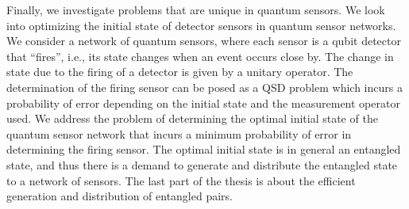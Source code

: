 Finally, we investigate problems that are unique in quantum sensors. We look into optimizing the initial state of detector sensors 
in quantum sensor networks. We consider a network of quantum sensors, where each sensor is a qubit detector that “fires”, 
i.e., its state changes when an event occurs close by. The change in state due to the firing of a detector is given 
by a unitary operator. The determination of the firing sensor can be posed as a QSD problem which incurs a probability 
of error depending on the initial state and the measurement operator used. We address the problem of determining 
the optimal initial state of the quantum sensor network that incurs a minimum probability of error in determining the firing sensor.
The optimal initial state is in general an entangled state, and thus there is a demand to generate and distribute the 
entangled state to a network of sensors. The last part of the thesis is about the efficient generation and distribution of entangled pairs.
